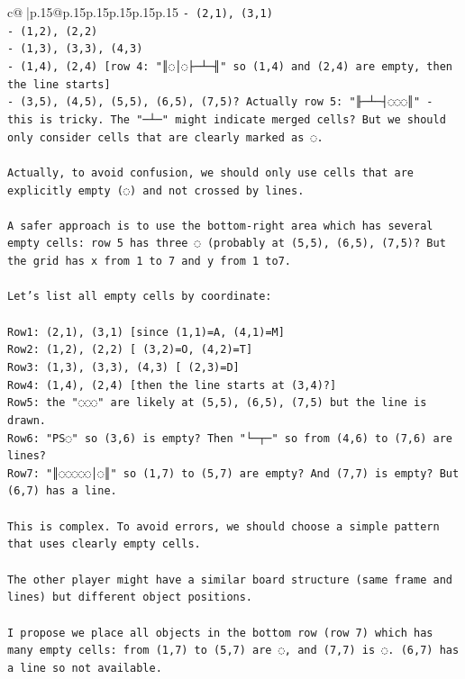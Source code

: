 \documentclass{article}
\begin{document}
{\begin{supertabular}{c@{$\;$}|p{.15\linewidth}@{}p{.15\linewidth}p{.15\linewidth}p{.15\linewidth}p{.15\linewidth}p{.15\linewidth}}
{{{\texttt{{-} (2,1), (3,1)} \\
\texttt{{-} (1,2), (2,2)} \\
\texttt{{-} (1,3), (3,3), (4,3)} \\
\texttt{{-} (1,4), (2,4) {[}row 4: "║◌│◌├─┴─╢" so (1,4) and (2,4) are empty, then the line starts{]}} \\
\texttt{{-} (3,5), (4,5), (5,5), (6,5), (7,5)? Actually row 5: "╟─┴─┤◌◌◌║" {-} this is tricky. The "─┴─" might indicate merged cells? But we should only consider cells that are clearly marked as ◌.} \\
\\ 
\texttt{Actually, to avoid confusion, we should only use cells that are explicitly empty (◌) and not crossed by lines.} \\
\\ 
\texttt{A safer approach is to use the bottom{-}right area which has several empty cells: row 5 has three ◌ (probably at (5,5), (6,5), (7,5)? But the grid has x from 1 to 7 and y from 1 to7.} \\
\\ 
\texttt{Let's list all empty cells by coordinate:} \\
\\ 
\texttt{Row1: (2,1), (3,1) {[}since (1,1)=A, (4,1)=M{]}} \\
\texttt{Row2: (1,2), (2,2) {[} (3,2)=O, (4,2)=T{]}} \\
\texttt{Row3: (1,3), (3,3), (4,3) {[} (2,3)=D{]}} \\
\texttt{Row4: (1,4), (2,4) {[}then the line starts at (3,4)?{]}} \\
\texttt{Row5: the "◌◌◌" are likely at (5,5), (6,5), (7,5) but the line is drawn.} \\
\texttt{Row6: "PS◌" so (3,6) is empty? Then "└─┬─" so from (4,6) to (7,6) are lines?} \\
\texttt{Row7: "║◌◌◌◌◌│◌║" so (1,7) to (5,7) are empty? And (7,7) is empty? But (6,7) has a line.} \\
\\ 
\texttt{This is complex. To avoid errors, we should choose a simple pattern that uses clearly empty cells.} \\
\\ 
\texttt{The other player might have a similar board structure (same frame and lines) but different object positions.} \\
\\ 
\texttt{I propose we place all objects in the bottom row (row 7) which has many empty cells: from (1,7) to (5,7) are ◌, and (7,7) is ◌. (6,7) has a line so not available.} \\
}}}
\end{supertabular}}
\end{document}
